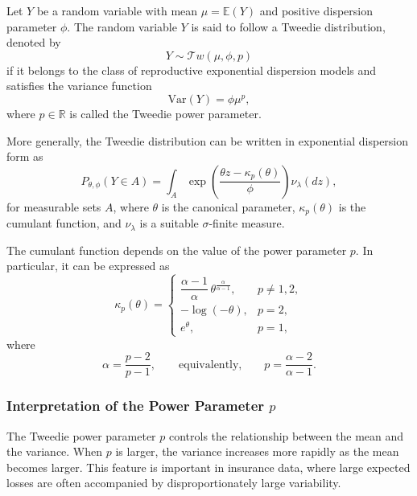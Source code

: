 \documentclass{sfuthesis}
\numberwithin{equation}{chapter}
\begin{document}
Let $Y$ be a random variable with mean $\mu = \mathbb{E}(Y)$ and positive dispersion parameter $\phi$. The random variable $Y$ is said to follow a Tweedie distribution, denoted by
\begin{equation}
    Y \sim \mathcal{T}w(\mu,\phi,p)
\end{equation}
if it belongs to the class of reproductive exponential dispersion models and satisfies the variance function
\begin{equation}
    \mathrm{Var}(Y) = \phi \mu^p,
    \label{eq:tweedie_variance_function}
\end{equation}
where $p \in \mathbb{R}$ is called the Tweedie power parameter.

More generally, the Tweedie distribution can be written in exponential dispersion form as
\begin{equation}
    P_{\theta,\phi}(Y \in A)
    =
    \int_A
    \exp\left(
        \frac{\theta z - \kappa_p(\theta)}{\phi}
    \right)\nu_\lambda(dz),
    \label{eq:tweedie_edm}
\end{equation}
for measurable sets $A$, where $\theta$ is the canonical parameter, $\kappa_p(\theta)$ is the cumulant function, and $\nu_\lambda$ is a suitable $\sigma$-finite measure.

The cumulant function depends on the value of the power parameter $p$. In particular, it can be expressed as
\begin{equation}
    \kappa_p(\theta)
    =
    \begin{cases}
    \dfrac{\alpha - 1}{\alpha}\, \theta^{\frac{\alpha}{\alpha - 1}}, & p \neq 1,2,\\[1.2em]
    -\log(-\theta), & p = 2,\\[0.6em]
    e^\theta, & p = 1,
    \end{cases}
    \label{eq:tweedie_cumulant}
\end{equation}
where
\begin{equation}
    \alpha = \frac{p-2}{p-1},
    \qquad \text{equivalently,} \qquad
    p = \frac{\alpha - 2}{\alpha - 1}.
\end{equation}

\subsubsection{Interpretation of the Power Parameter $p$}

The Tweedie power parameter $p$ controls the relationship between the mean and the variance. When $p$ is larger, the variance increases more rapidly as the mean becomes larger. This feature is important in insurance data, where large expected losses are often accompanied by disproportionately large variability.
\end{document}
